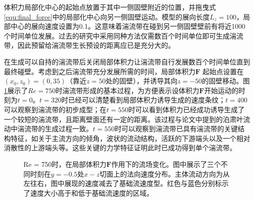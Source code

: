 体积力局部化中心的起始点放置于其中一侧固壁附近的位置，并拖曳式\ref{equ:final_force}中的局部化中心向另一侧固壁运动。模型的展向长度$L_z = 100$，局部中心的展向速度设置为0.1。这意味着湍流带在碰到另一侧固壁壁前有将近1000个时间单位发展。过去的研究中采用同种方法仅需数百个时间单位即可生成湍流带\cite{Song2020}，因此预留给湍流带生长预设的距离应已是充分大的。

在生成可以自持的湍流带后关闭局部体积力让湍流带自行发展数百个时间单位直到最终碰壁。考虑到之后湍流带充分发展所需的时间，局部体积力$\bm F$ 起始点设置在$(x_0, z_0)= (0,35)$（靠近$z=50$处的固壁），并诱导其向$z=-50$的固壁移动。图\ref{fig:turbulentband}展示了$Re = 750$时湍流带形成的基本过程，为方便表示设体积力$\bm F$开始运动的时刻为$t = 0$。$t = 320$时已经可以清楚看到局部体积力诱导生成的速度条纹；$t = 400$可以观察到湍流带的初步成型；在$t = 550$时可以看到体积力已经成功诱导生成了一个较短的湍流带，且距离壁面还有一定的距离。该过程与论文\cite{Song2020}中提到的泊肃叶流动中湍流带的生成过程一致。$t = 550$时可以观察到湍流带已具有湍流带的关键结构特征，如关于主流方向的倾角，波状的流动结构，活跃的下游端头以及一个相对消散性的上游端头等。这些关键的力学特征证明此时已成功得到单个湍流带。

\begin{figure}[htb]
\begin{minipage}[h]{0.29\linewidth}
		\centering
	\end{minipage}
	\begin{minipage}[h]{0.29\linewidth}
		\centering
	\end{minipage}
	\begin{minipage}[h]{0.29\linewidth}
	\centering
	\end{minipage}
	\begin{minipage}[h]{0.1\linewidth}
	\centering
	\end{minipage}
\caption{Re = 750时，在局部体积力$\bm F$作用下的流场变化。图中展示了三个不同时刻在$y = -0.5$处$x-z$切面上的法向速度分布。主体流动方向为从左往右，图中展现的速度减去了基础流速度型。红色与蓝色分别标示了速度大小高于和低于基础流速度的区域。{\color{black}{图中黑线加粗的上下边缘代表了槽道的两侧侧壁。}}}\label{fig:turbulentband}
\end{figure}


